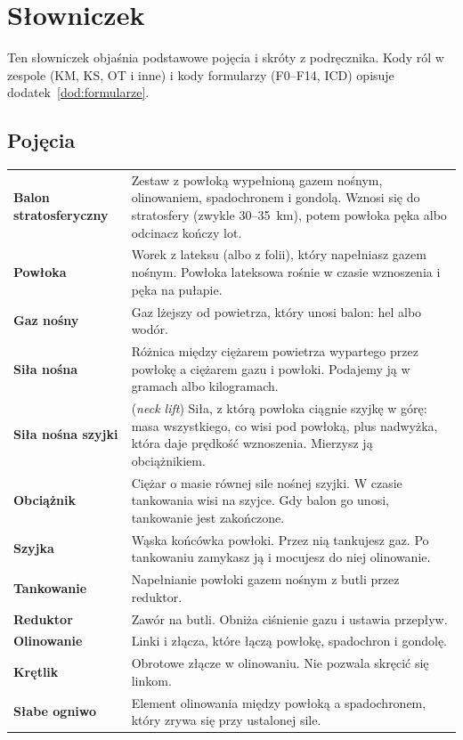 \chapter*{Słowniczek}
Ten słowniczek objaśnia podstawowe pojęcia i skróty z podręcznika. Kody ról w zespole (KM, KS, OT i inne) i kody formularzy (F0--F14, ICD) opisuje dodatek~\ref{dod:formularze}.

\renewcommand{\arraystretch}{1.0}
\small
\section*{Pojęcia}
\noindent\begin{tabularx}{\linewidth}{@{}>{\bfseries}P{33mm}L@{}}
\toprule
Balon stratosferyczny & Zestaw z powłoką wypełnioną gazem nośnym, olinowaniem, spadochronem i gondolą. Wznosi się do stratosfery (zwykle 30--\SI{35}{km}), potem powłoka pęka albo odcinacz kończy lot.\\
Powłoka & Worek z lateksu (albo z folii), który napełniasz gazem nośnym. Powłoka lateksowa rośnie w czasie wznoszenia i pęka na pułapie.\\
Gaz nośny & Gaz lżejszy od powietrza, który unosi balon: hel albo wodór.\\
Siła nośna & Różnica między ciężarem powietrza wypartego przez powłokę a ciężarem gazu i powłoki. Podajemy ją w gramach albo kilogramach.\\
Siła nośna szyjki & (\emph{neck lift}) Siła, z którą powłoka ciągnie szyjkę w górę: masa wszystkiego, co wisi pod powłoką, plus nadwyżka, która daje prędkość wznoszenia. Mierzysz ją obciążnikiem.\\
Obciążnik & Ciężar o masie równej sile nośnej szyjki. W czasie tankowania wisi na szyjce. Gdy balon go unosi, tankowanie jest zakończone.\\
Szyjka & Wąska końcówka powłoki. Przez nią tankujesz gaz. Po tankowaniu zamykasz ją i mocujesz do niej olinowanie.\\
Tankowanie & Napełnianie powłoki gazem nośnym z butli przez reduktor.\\
Reduktor & Zawór na butli. Obniża ciśnienie gazu i ustawia przepływ.\\
Olinowanie & Linki i złącza, które łączą powłokę, spadochron i gondolę.\\
Krętlik & Obrotowe złącze w olinowaniu. Nie pozwala skręcić się linkom.\\
Słabe ogniwo & Element olinowania między powłoką a spadochronem, który zrywa się przy ustalonej sile.\\

\end{tabularx}
